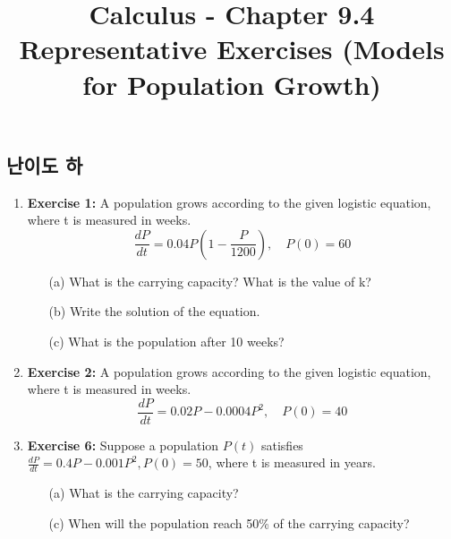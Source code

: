 \documentclass[12pt, a4paper]{article}
\title{Calculus - Chapter 9.4 Representative Exercises (Models for Population Growth)}
\author{}
\date{}
\begin{document}
\maketitle
\hrulefill
\vspace{1em}

\subsection*{난이도 하 }
\begin{enumerate}
    \item \textbf{Exercise 1:} A population grows according to the given logistic equation, where t is measured in weeks.
    \[ \frac{dP}{dt} = 0.04P\left(1 - \frac{P}{1200}\right), \quad P(0) = 60 \]
    \begin{itemize}
        \item[(a)] What is the carrying capacity? What is the value of k?
        \item[(b)] Write the solution of the equation.
        \item[(c)] What is the population after 10 weeks?
    \end{itemize}

    \item \textbf{Exercise 2:} A population grows according to the given logistic equation, where t is measured in weeks.
    \[ \frac{dP}{dt} = 0.02P - 0.0004P^2, \quad P(0) = 40 \]
    
    \item \textbf{Exercise 6:} Suppose a population $P(t)$ satisfies $\frac{dP}{dt} = 0.4P - 0.001P^2, P(0)=50$, where t is measured in years.
    \begin{itemize}
        \item[(a)] What is the carrying capacity?
        \item[(c)] When will the population reach 50\% of the carrying capacity?
    \end{itemize}
\end{enumerate}

\hrulefill
\vspace{1em}
\end{document}

